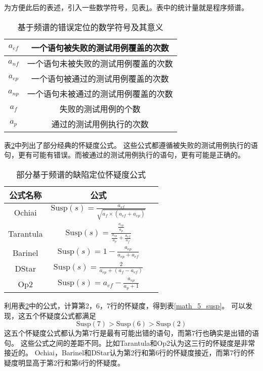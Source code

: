 为方便此后的表述，引入一些数学符号，见表\ref{spec_symbol}。表中的统计量就是程序频谱。
\begin{table}
\centering
\begin{tabular}{|c|c|}
\hline
$a_{ef}$ & 一个语句被失败的测试用例覆盖的次数 \\
\hline
$a_{nf}$ & 一个语句未被失败的测试用例覆盖的次数 \\
\hline
$a_{ep}$ & 一个语句被通过的测试用例覆盖的次数 \\
\hline
$a_{np}$ & 一个语句未被通过的测试用例覆盖的次数 \\
\hline
$a_{f}$ & 失败的测试用例的个数 \\
\hline
$a_{p}$ & 通过的测试用例执行的次数 \\
\hline
\end{tabular}
\caption{基于频谱的错误定位的数学符号及其意义}
\label{spec_symbol}
\end{table}

表\ref{susp_formula}中列出了部分经典的怀疑度公式。
这些公式都遵循被失败的测试用例执行的语句，更有可能有错误。而被通过的测试用例执行的语句，更有可能是正确的。

\begin{table}
\centering
\begin{tabular}{|c|c|c|}
\hline
公式名称 & 公式 \\
\hline
Ochiai\parencite{Abreu2006An} & $\mathrm{Susp}(s) = \frac{a_{ef}}{\sqrt{a_{f} \times (a_{ef} + a_{ep})}}$ \\
\hline
Tarantula\parencite{Jones2002Visualization} &
$\mathrm{Susp}(s) = \frac{\frac{a_{ep}}{a_{p}}}{\frac{a_{ep}}{a_{p}} + \frac{a_{ef}}{a_{f}}}$ \\
\hline
Barinel\parencite{Abreu2009Spectrum} &
$\mathrm{Susp}(s) = 1 - \frac{a_{ep}}{a_{ep} + a_{ef}}$ \\
\hline
DStar\parencite{Wong2014The} &
$\mathrm{Susp}(s) = \frac{2}{a_{ep} + (a_f - a_{ef})}$ \\
\hline
Op2\parencite{Naish2011A} &
$\mathrm{Susp}(s) = a_{ef} - \frac{a_{ep}}{a_p + 1}$ \\
\hline
\end{tabular}
\caption{部分基于频谱的缺陷定位怀疑度公式}
\label{susp_formula}
\end{table}

利用表\ref{susp_formula}中的公式，计算第2，6，7行的怀疑度，得到表\ref{math_5_susp}。
可以发现，这五个怀疑度公式都满足
$$
\mathrm{Susp}(7) > \mathrm{Susp}(6) > \mathrm{Susp}(2)
$$
这五个怀疑度公式都认为第7行是最有可能出错的语句，而第7行也确实是出错的语句。
这些公式之间的差距不同。比如Tarantula和Op2认为这三行的怀疑度是非常接近的。
Ochiai，Barinel和DStar认为第2行和第6行的怀疑度接近，而第7行的怀疑度明显高于第2行和第6行的怀疑度。

